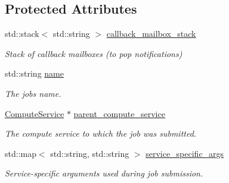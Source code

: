 \subsection*{Protected Attributes}
\begin{DoxyCompactItemize}
\item 
\mbox{\label{classwrench_1_1_workflow_job_ab2c1544d499e081a35f2998f53a02278}} 
std\+::stack$<$ std\+::string $>$ \hyperlink{classwrench_1_1_workflow_job_ab2c1544d499e081a35f2998f53a02278}{callback\+\_\+mailbox\+\_\+stack}
\begin{DoxyCompactList}\small\item\em Stack of callback mailboxes (to pop notifications) \end{DoxyCompactList}\item 
\mbox{\label{classwrench_1_1_workflow_job_a098ede62860e053e09ae646500e1e8c7}} 
std\+::string \hyperlink{classwrench_1_1_workflow_job_a098ede62860e053e09ae646500e1e8c7}{name}
\begin{DoxyCompactList}\small\item\em The job\textquotesingle{}s name. \end{DoxyCompactList}\item 
\mbox{\label{classwrench_1_1_workflow_job_a423c81e6202b24b97fe2056076a90a2c}} 
\hyperlink{classwrench_1_1_compute_service}{Compute\+Service} $\ast$ \hyperlink{classwrench_1_1_workflow_job_a423c81e6202b24b97fe2056076a90a2c}{parent\+\_\+compute\+\_\+service}
\begin{DoxyCompactList}\small\item\em The compute service to which the job was submitted. \end{DoxyCompactList}\item 
\mbox{\label{classwrench_1_1_workflow_job_a24db446e553bf3879fa3a5903067f259}} 
std\+::map$<$ std\+::string, std\+::string $>$ \hyperlink{classwrench_1_1_workflow_job_a24db446e553bf3879fa3a5903067f259}{service\+\_\+specific\+\_\+args}
\begin{DoxyCompactList}\small\item\em Service-\/specific arguments used during job submission. \end{DoxyCompactList}\item 
\mbox{\label{classwrench_1_1_workflow_job_a0b3c7ad93f7a2515e7923370681f86d5}} 

\end{DoxyCompactItemize}
